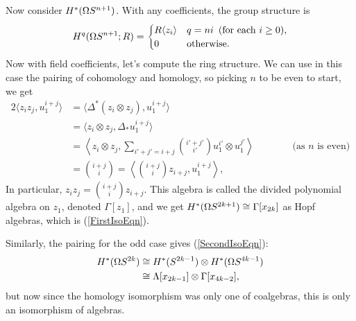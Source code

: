 Now consider $H^* (\Omega S^{n+1})$.  With any coefficients, the group structure is
\[
H^q(\Omega S^{n+1}; R) = \begin{cases} R \langle z_i \rangle & q=ni\textup{ \,(for each $i\geq0$)}, \\ 0 & \mathrm{otherwise}. \end{cases}
\]
Now with field coefficients, let's compute the ring structure.  We can use in this case the pairing of cohomology and homology, so picking $n$ to be even to start, we get
\begin{alignat*}{2}
\langle z_i z_j, u_1^{i+j} \rangle & = \langle \Delta^*(z_i \otimes z_j), u_1^{i+j} \rangle&\qquad& \\
& = \langle z_i \otimes z_j, \Delta_* u_1^{i+j} \rangle \\
& = \left\langle z_i \otimes z_j, \sum_{i'+j'=i+j} {\textstyle\binom{i'+j'}{i'}} u_1^{i'} \otimes u_1^{j'} \right\rangle&&\text{\ (as $n$ is even)} \\
& = {\textstyle\binom{i+j}{i}} = \left\langle {\textstyle\binom{i+j}{i}} z_{i+j}, u_1^{i+j} \right\rangle,
\end{alignat*}
In particular, $z_i z_j = \binom{i+j}{i} z_{i+j}$. This algebra is called the divided polynomial algebra on $z_1$, denoted $\Gamma[z_1]$, and we get $H^* (\Omega S^{2k+1}) \cong \Gamma[x_{2k}]$ as Hopf algebras, which is (\ref{FirstIsoEqn}).

Similarly, the pairing for the odd case gives (\ref{SecondIsoEqn}):
\begin{align*}
H^* (\Omega S^{2k}) & \cong H^* (S^{2k-1}) \otimes H^* (\Omega S^{4k-1}) \\
& \cong \Lambda[x_{2k-1}] \otimes \Gamma[x_{4k-2}],
\end{align*}
but now since the homology isomorphism was only one of coalgebras, this is only an isomorphism of algebras.


